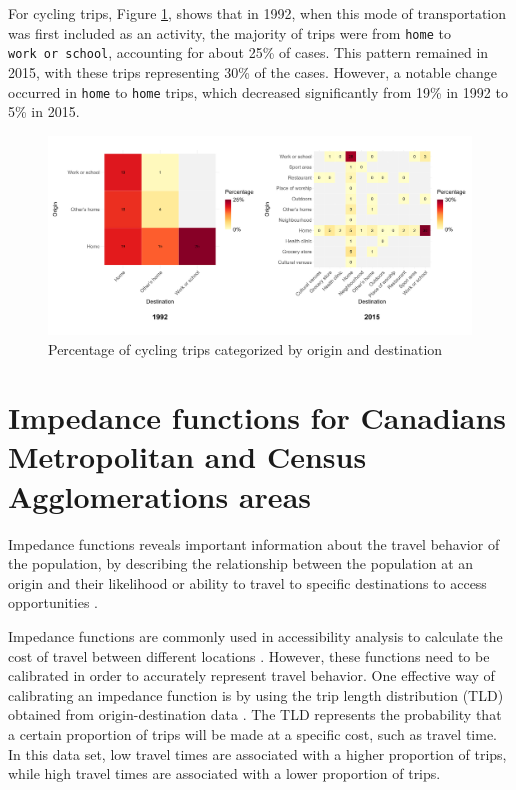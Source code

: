 \documentclass[Royal,times,sageh]{sagej}
\begin{document}
For cycling trips, Figure \ref{fig:figure-02}, shows that in 1992, when
this mode of transportation was first included as an activity, the
majority of trips were from \texttt{home} to \texttt{work\ or\ school},
accounting for about 25\% of cases. This pattern remained in 2015, with
these trips representing 30\% of the cases. However, a notable change
occurred in \texttt{home} to \texttt{home} trips, which decreased
significantly from 19\% in 1992 to 5\% in 2015.

\begin{figure}

{\centering \includegraphics[width=1\linewidth]{Manuscript-figures/cycling_hm_fig} 

}

\caption{Percentage of cycling trips categorized by origin and destination}\label{fig:figure-02}
\end{figure}

\hypertarget{impedance-functions-for-canadians-metropolitan-and-census-agglomerations-areas}{%
\section{Impedance functions for Canadians Metropolitan and Census
Agglomerations
areas}\label{impedance-functions-for-canadians-metropolitan-and-census-agglomerations-areas}}

Impedance functions reveals important information about the travel
behavior of the population, by describing the relationship between the
population at an origin and their likelihood or ability to travel to
specific destinations to access opportunities \citep{soukhov2024}.

Impedance functions are commonly used in accessibility analysis to
calculate the cost of travel between different locations
\citep{hansen1959, páez2012, palacios2022}. However, these functions
need to be calibrated in order to accurately represent travel behavior.
One effective way of calibrating an impedance function is by using the
trip length distribution (TLD) obtained from origin-destination data
\citep{soukhov2024}. The TLD represents the probability that a certain
proportion of trips will be made at a specific cost, such as travel
time. In this data set, low travel times are associated with a higher
proportion of trips, while high travel times are associated with a lower
proportion of trips.
\end{document}
